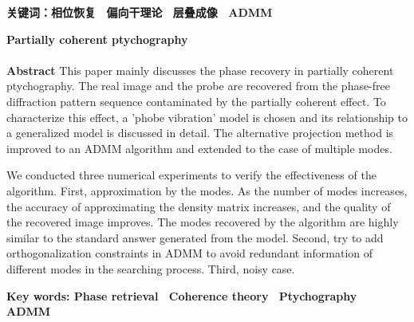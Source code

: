 \documentclass[12pt]{article}
\begin{document}
	\textbf{关键词：相位恢复~  偏向干理论~ 层叠成像~ ADMM}
	
	\newpage
	\thispagestyle{empty}
	\begin{center}
		\large \textbf{Partially coherent ptychography} ~\\ ~\\
		\normalsize \textbf{Abstract}
		This paper mainly discusses the phase recovery in partially coherent ptychography. The real image and the probe are recovered from the phase-free diffraction pattern sequence contaminated by the partially coherent effect. To characterize this effect, a 'phobe vibration' model is chosen and its relationship to a generalized model is discussed in detail. The alternative projection method is improved to an ADMM algorithm and extended to the case of multiple modes.
		
		We conducted three numerical experiments to verify the effectiveness of the algorithm. First, approximation by the modes. As the number of modes increases, the accuracy of approximating the density matrix increases, and the quality of the recovered image improves. The modes recovered by the algorithm are highly similar to the standard answer generated from the model. Second, try to add orthogonalization constraints in ADMM to avoid redundant information of different modes in the searching process. Third, noisy case.
	\end{center}
	

	\textbf{Key words: Phase retrieval~  Coherence theory~ Ptychography~ ADMM}
	
	\newpage
	\thispagestyle{empty}
	\tableofcontents
	
	\newpage
	\thispagestyle{empty}
	\listoffigures
	
	\listoftables
	
	\newpage
	\setcounter{page}{1}

\cite{anderson2016robust}
\cite{giglio2021asset}

\newpage
 
 
 
 

	
	
	
	

	

	
	
	
	
	
\end{document}

